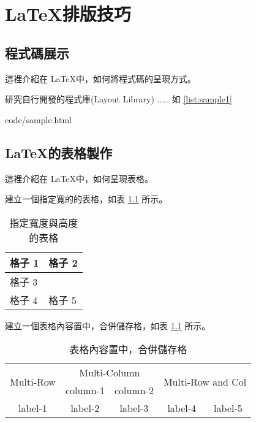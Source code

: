 \chapter{\LaTeX 排版技巧}

  \section{程式碼展示}

這裡介紹在 \LaTeX 中，如何將程式碼的呈現方式。

研究自行開發的程式庫(Layout Library) ..... 如 \ref{list:sample1}

    \noindent \begin{minipage}[t]{1\textwidth} 
      {code/sample.html}
    \end{minipage}

  \section{\LaTeX 的表格製作}

這裡介紹在 \LaTeX 中，如何呈現表格。

建立一個指定寬的的表格，如表 \ref{tab:table1} 所示。

\begin{table}[htbp]
\centering
\caption{\label{tab:table1}指定寬度與高度的表格}
\begin{tabular}{|p{3cm}|p{3cm}|}
\hline
格子 1 & 格子 2 \\[1cm]
\hline
\multicolumn{2}{|l|}{格子 3} \\[2cm]
\hline
格子 4 & 格子 5 \\[1cm]
\hline
\end{tabular}
\end{table}

建立一個表格內容置中，合併儲存格，如表 \ref{tab:table1} 所示。

\begin{table}[htbp]
\centering
\caption{\label{tab:table2}表格內容置中，合併儲存格}
\begin{tabular}{|c|c|c|c|c|}
\hline
\multirow{2}{*}{Multi-Row} &
\multicolumn{2}{c|}{Multi-Column} &
\multicolumn{2}{c|}{\multirow{2}{*}{Multi-Row and Col}} \\
\cline{2-3}
  & column-1 & column-2 & \multicolumn{2}{c|}{} \\
\hline
label-1 & label-2 & label-3 & label-4 & label-5 \\
\hline
\end{tabular}
\end{table}
